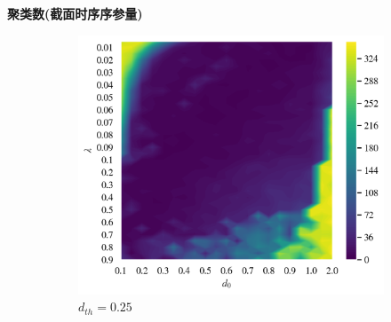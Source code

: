 \documentclass{article}
\begin{document}
\newpage
\noindent\textbf{聚类数(截面时序序参量)}

\begin{figure}[H]
	\centering
	\begin{subfigure}[b]{0.49\textwidth}
		\includegraphics[width=\textwidth]{./figs/classNum1.png}
		\vspace{-1cm}
		\caption{$d_{th}=0.25$}
	\end{subfigure}
	\begin{subfigure}[b]{0.49\textwidth}

\end{subfigure}
\end{figure}
\end{document}
